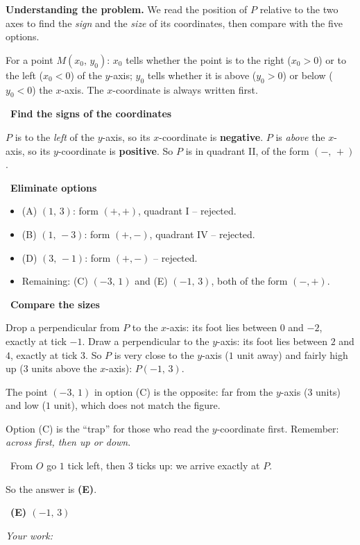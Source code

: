 \documentclass[11pt]{article}
\newif\ifsol \solfalse
\providecommand{\AnsWord}{Đáp số}
\newcommand{\ans}[1]{\par\smallskip{\bfseries\color{tmGreen!88!black}\AnsWord:}\ {\bfseries\color{AnsRed}#1}\par}
\newcommand{\probsol}[1]{%
  \begin{lrbox}{\solmeasure}\begin{minipage}{\dimexpr\linewidth-24pt\relax}#1\end{minipage}\end{lrbox}%
  \ifsol
    \begin{solbox}#1\end{solbox}%
  \else
    \setlength{\solht}{\dimexpr\ht\solmeasure+\dp\solmeasure+0.85cm\relax}%
    \ifdim\solht<1.35cm\setlength{\solht}{1.35cm}\fi
    \ifdim\solht>\StudentMaxWork\setlength{\solht}{\StudentMaxWork}\fi
    \begin{tcolorbox}[colback=white,colframe=Line,boxrule=0.8pt,arc=5pt,
      left=8pt,right=8pt,top=4pt,bottom=4pt,height=\solht]{\footnotesize\color{Slate}\itshape\WorkWord}\end{tcolorbox}%
  \fi}
\newlength{\StudentMaxWork}\setlength{\StudentMaxWork}{7.5cm}
\newcommand{\step}[2]{\par\smallskip\noindent{\bfseries\color{tmBlue!85!black}\StepWord~#1.}\ {\bfseries #2}\par\nopagebreak}
\newcommand{\verify}[1]{\par\smallskip\noindent{\bfseries\color{tmGreen!80!black}\faCheckCircle\ \CheckWord}\ #1\par}
\def\WorkWord{Your work:}
\def\AnsWord{Answer}
\def\StepWord{Step}
\def\CheckWord{Check:}
\begin{document}
\probsol{
\textbf{Understanding the problem.} We read the position of $P$ relative to the two axes to find the \emph{sign} and the \emph{size} of its coordinates, then compare with the five options.
\begin{recallbox}For a point $M(x_0,\,y_0)$: $x_0$ tells whether the point is to the right ($x_0>0$) or to the left ($x_0<0$) of the $y$-axis; $y_0$ tells whether it is above ($y_0>0$) or below ($y_0<0$) the $x$-axis. The $x$-coordinate is always written first.\end{recallbox}
\step{1}{Find the signs of the coordinates}
$P$ is to the \emph{left} of the $y$-axis, so its $x$-coordinate is \textbf{negative}.
$P$ is \emph{above} the $x$-axis, so its $y$-coordinate is \textbf{positive}.
So $P$ is in quadrant II, of the form $(-,\,+)$.

\step{2}{Eliminate options}
\begin{itemize}[leftmargin=1.3em,itemsep=0pt,topsep=0pt]
  \item (A) $(1,\,3)$: form $(+,+)$, quadrant I -- rejected.
  \item (B) $(1,\,-3)$: form $(+,-)$, quadrant IV -- rejected.
  \item (D) $(3,\,-1)$: form $(+,-)$ -- rejected.
  \item Remaining: (C) $(-3,\,1)$ and (E) $(-1,\,3)$, both of the form $(-,+)$.
\end{itemize}

\step{3}{Compare the sizes}
Drop a perpendicular from $P$ to the $x$-axis: its foot lies between $0$ and $-2$, exactly at tick $-1$. Draw a perpendicular to the $y$-axis: its foot lies between $2$ and $4$, exactly at tick $3$. So $P$ is very close to the $y$-axis ($1$ unit away) and fairly high up ($3$ units above the $x$-axis): $P(-1,\,3)$.

The point $(-3,\,1)$ in option (C) is the opposite: far from the $y$-axis ($3$ units) and low ($1$ unit), which does not match the figure.
\begin{warnbox}Option (C) is the ``trap'' for those who read the $y$-coordinate first. Remember: \emph{across first, then up or down}.\end{warnbox}
\verify{From $O$ go $1$ tick left, then $3$ ticks up: we arrive exactly at $P$.}
So the answer is \textbf{(E)}.
\ans{(E) $(-1,\,3)$}
}
\end{document}
